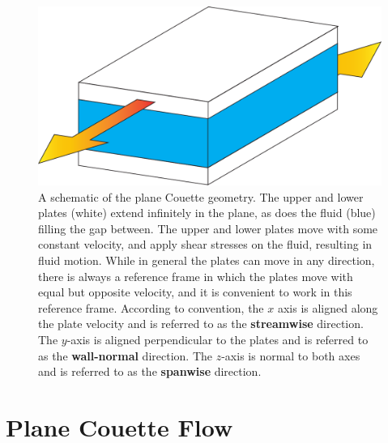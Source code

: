 \begin{figure}[h!]
\centerline{
\includegraphics[scale=0.4]{Figs/planeCouetteDiagram}}
\caption{A schematic of the plane Couette geometry. The upper and lower plates (white) extend infinitely in the plane, as does the fluid (blue) filling the gap between. The upper and lower plates move with some constant velocity, and apply shear stresses on the fluid, resulting in fluid motion. While in general the plates can move in any direction, there is always a reference frame in which the plates move with equal but opposite velocity, and it is convenient to work in this reference frame. According to convention, the $x$ axis is aligned along the plate velocity and is referred to as the {\bf streamwise} direction. The $y$-axis is aligned perpendicular to the plates and is referred to as the {\bf wall-normal} direction. The $z$-axis is normal to both axes and is referred to as the {\bf spanwise} direction.}\label{fig:planeCouette}
\end{figure}

\section{Plane Couette Flow} 

